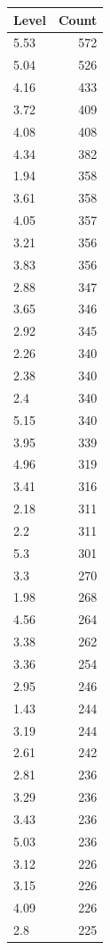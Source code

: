 \begin{table}[ht]
\centering
\begin{tabular}{lr}
  \hline
Level & Count \\ 
  \hline
5.53 & 572 \\ 
  5.04 & 526 \\ 
  4.16 & 433 \\ 
  3.72 & 409 \\ 
  4.08 & 408 \\ 
  4.34 & 382 \\ 
  1.94 & 358 \\ 
  3.61 & 358 \\ 
  4.05 & 357 \\ 
  3.21 & 356 \\ 
  3.83 & 356 \\ 
  2.88 & 347 \\ 
  3.65 & 346 \\ 
  2.92 & 345 \\ 
  2.26 & 340 \\ 
  2.38 & 340 \\ 
  2.4 & 340 \\ 
  5.15 & 340 \\ 
  3.95 & 339 \\ 
  4.96 & 319 \\ 
  3.41 & 316 \\ 
  2.18 & 311 \\ 
  2.2 & 311 \\ 
  5.3 & 301 \\ 
  3.3 & 270 \\ 
  1.98 & 268 \\ 
  4.56 & 264 \\ 
  3.38 & 262 \\ 
  3.36 & 254 \\ 
  2.95 & 246 \\ 
  1.43 & 244 \\ 
  3.19 & 244 \\ 
  2.61 & 242 \\ 
  2.81 & 236 \\ 
  3.29 & 236 \\ 
  3.43 & 236 \\ 
  5.03 & 236 \\ 
  3.12 & 226 \\ 
  3.15 & 226 \\ 
  4.09 & 226 \\ 
  2.8 & 225 \\ 

\end{tabular}
\end{table}
